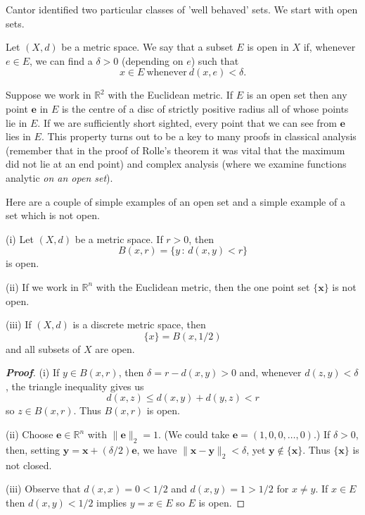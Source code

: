 Cantor identified two particular classes of 'well behaved'
sets. We start with open sets.

\begin{definition}\label{D;metric open set}
Let $(X,d)$ be a metric space.
We say that a subset $E$ is open in $X$ if, whenever
$e\in E$, we can find a $\delta>0$ (depending on $e$)
such that 
\[x\in E\ \text{whenever}\ d(x,e)<\delta.\]
\end{definition} 
Suppose we work in ${\mathbb R}^{2}$ with the Euclidean
metric. If $E$ is an open set then any point ${\mathbf e}$ in $E$
is the centre of a disc of strictly positive radius
all of whose points lie in $E$. If we are sufficiently
short sighted, every point that we can see from ${\mathbf e}$
lies in $E$. This property turns out to be a key to
many proofs in classical analysis (remember that in the
proof of Rolle's theorem it was vital that the maximum
did not lie at an end point) and complex analysis
(where we examine functions analytic \emph{on an open set}).

Here are a couple of simple examples of an open set 
and a simple example
of a set which is not open.

\begin{theorem}\label{E;Open ball open} 
(i) Let $(X,d)$ be a metric space.
If $r>0$, then
\[B(x,r)=\{y\,:\,d(x,y)<r\}\]
is open. 

(ii) If we work in ${\mathbb R}^{n}$ with the Euclidean metric,
then the one point set $\{{\mathbf x}\}$ is not open.

(iii) If $(X,d)$ is a discrete metric space, then
\[\{x\}=B(x,1/2)\]
and all subsets of $X$ are open.
\end{theorem}

\begin{proof}[\bf Proof] (i) If $y\in B(x,r)$, then 
$\delta=r-d(x,y)>0$ and,
whenever $d(z,y)<\delta$,
the triangle inequality gives us
\[d(x,z)\leq d(x,y)+d(y,z)<r\]
so $z\in B(x,r)$. Thus $B(x,r)$ is open.

(ii) Choose ${\mathbf e}\in{\mathbb R}^{n}$ with $\|{\mathbf e}\|_{2}=1$.
(We could take ${\mathbf e}=(1,0,0,\dots,0)$.) If $\delta>0$,
then, setting ${\mathbf y}={\mathbf x}+(\delta/2){\mathbf e}$, we have
$\|{\mathbf x}-{\mathbf y}\|_{2}<\delta$, 
yet ${\mathbf y}\notin\{{\mathbf x}\}$.
Thus $\{{\mathbf x}\}$ is not closed.

(iii) Observe that $d(x,x)=0<1/2$ and $d(x,y)=1>1/2$ for $x\neq y$.
If $x\in E$ then $d(x,y)<1/2$ implies $y=x\in E$ so $E$ is open.
\end{proof}

